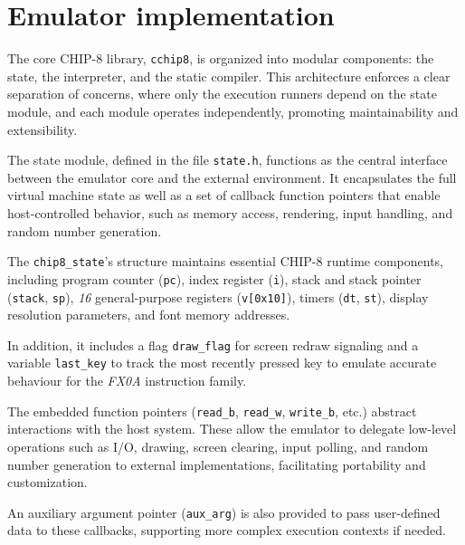 \section{Emulator implementation}
\label{sec:ch3sec3}

\par The core CHIP-8 library, \texttt{cchip8\cite{GithubCCHIP8}}, is organized into modular components: the state, the interpreter, and the static compiler. This architecture enforces a clear separation of concerns, where only the execution runners depend on the state module, and each module operates independently, promoting maintainability and extensibility.

\par The state module, defined in the file \texttt{state.h}, functions as the central interface between the emulator core and the external environment. It encapsulates the full virtual machine state as well as a set of callback function pointers that enable host-controlled behavior, such as memory access, rendering, input handling, and random number generation.

\par The \texttt{chip8\_state}'s structure maintains essential CHIP-8 runtime components, including program counter (\texttt{pc}), index register (\texttt{i}), stack and stack pointer (\texttt{stack}, \texttt{sp}), \textit{16} general-purpose registers (\texttt{v[0x10]}), timers (\texttt{dt}, \texttt{st}), display resolution parameters, and font memory addresses.

\par In addition, it includes a flag \texttt{draw\_flag} for screen redraw signaling and a variable \texttt{last\_key} to track the most recently pressed key to emulate accurate behaviour for the \textit{FX0A} instruction family.

\par The embedded function pointers (\texttt{read\_b}, \texttt{read\_w}, \texttt{write\_b}, etc.) abstract interactions with the host system. These allow the emulator to delegate low-level operations such as I/O, drawing, screen clearing, input polling, and random number generation to external implementations, facilitating portability and customization.

\par An auxiliary argument pointer (\texttt{aux\_arg}) is also provided to pass user-defined data to these callbacks, supporting more complex execution contexts if needed.

